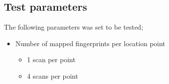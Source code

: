 

\subsection{Test parameters}\label{sec:methodTestParameters}
The following parameters was set to be tested;

\begin{itemize}
\item Number of mapped fingerprints per location point
	\begin{itemize}
	\item 1 scan per point
	\item 4 scans per point
	\end{itemize}
\end{itemize}


